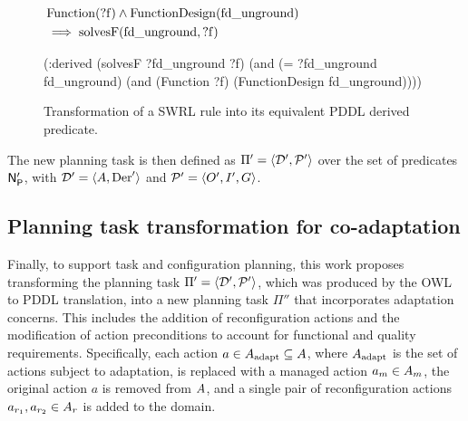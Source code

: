 \begin{figure}[tbp]
\centering
\begin{minipage}{0.6\linewidth}
\captionsetup{type=listing}
$\begin{aligned}
&\operatorname{Function}(\operatorname{?f}) \wedge \operatorname{FunctionDesign}(\operatorname{fd\_unground}) \\
&\implies \operatorname{solvesF}(\operatorname{fd\_unground}, \operatorname{?f})
\end{aligned}$
\caption{SWRL rule}%
\label{planta:lst:swrl_math}
\end{minipage}

\bigskip

\begin{minipage}{0.6\linewidth}
\captionsetup{type=listing}
\begin{Piton}[language=PDDL]
(:derived (solvesF ?fd_unground ?f)
  (and (= ?fd_unground fd_unground)
    (and (Function ?f)
      (FunctionDesign fd_unground))))
\end{Piton}
\caption{PDDL derived predicate}%
\label{planta:lst:pddl_rule}
\end{minipage}
\caption{Transformation of a SWRL rule into its equivalent PDDL derived predicate.}%
\label{planta:fig:swrl_to_pddl}
\end{figure}


The new planning task is then defined as $\Pi' = \langle \mathcal{D}', \mathcal{P}' \rangle$ over the set of predicates $\mathsf{N}_\mathsf{P}'$,
with $\mathcal{D}' = \langle A, \text{Der}' \rangle$ and $\mathcal{P}'= \langle O', I', G \rangle$.

\subsection{Planning task transformation for co-adaptation}\label{planta:sec:plan_transformation_taca}

Finally, to support task and configuration planning, this work proposes transforming the planning task $\Pi' = \langle \mathcal{D}', \mathcal{P}' \rangle$, which was produced by the OWL to PDDL translation, into a new planning task $\Pi''$ that incorporates adaptation concerns. This includes the addition of reconfiguration actions and the modification of action preconditions to account for functional and quality requirements. Specifically, each action $a \in A_{\text{adapt}} \subseteq A$, where $A_{\text{adapt}}$ is the set of actions subject to adaptation, is replaced with a managed action $a_m \in A_m$, the original action $a$ is removed from $A$, and a single pair of reconfiguration  actions $a_{r_1}, a_{r_2} \in A_r$ is added to the domain.

